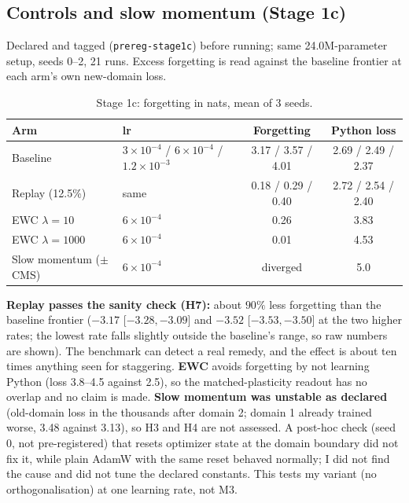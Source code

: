 \documentclass[10pt]{article}
\begin{document}
\subsection{Controls and slow momentum (Stage 1c)}\label{sec:s1c}
Declared and tagged (\texttt{prereg-stage1c}) before running; same 24.0M-parameter setup, seeds 0--2, 21 runs. Excess forgetting is read against the baseline frontier at each arm's own new-domain loss.
\begin{table}[h]\centering\small
\begin{tabular}{llcc}\toprule
Arm & lr & Forgetting & Python loss\\ \midrule
Baseline & $3\times10^{-4}$ / $6\times10^{-4}$ / $1.2\times10^{-3}$ & 3.17 / 3.57 / 4.01 & 2.69 / 2.49 / 2.37\\
Replay (12.5\%) & same & 0.18 / 0.29 / 0.40 & 2.72 / 2.54 / 2.40\\
EWC $\lambda=10$ & $6\times10^{-4}$ & 0.26 & 3.83\\
EWC $\lambda=1000$ & $6\times10^{-4}$ & 0.01 & 4.53\\
Slow momentum ($\pm$ CMS) & $6\times10^{-4}$ & diverged & 5.0\\ \bottomrule
\end{tabular}
\caption{Stage 1c: forgetting in nats, mean of 3 seeds.}
\end{table}
\textbf{Replay passes the sanity check (H7):} about $90\%$ less forgetting than the baseline frontier ($-3.17$ [$-3.28,-3.09$] and $-3.52$ [$-3.53,-3.50$] at the two higher rates; the lowest rate falls slightly outside the baseline's range, so raw numbers are shown). The benchmark can detect a real remedy, and the effect is about ten times anything seen for staggering.
\textbf{EWC} avoids forgetting by not learning Python (loss 3.8--4.5 against 2.5), so the matched-plasticity readout has no overlap and no claim is made.
\textbf{Slow momentum was unstable as declared} (old-domain loss in the thousands after domain 2; domain 1 already trained worse, 3.48 against 3.13), so H3 and H4 are not assessed. A post-hoc check (seed 0, not pre-registered) that resets optimizer state at the domain boundary did not fix it, while plain AdamW with the same reset behaved normally; I did not find the cause and did not tune the declared constants. This tests my variant (no orthogonalisation) at one learning rate, not M3.
\end{document}
